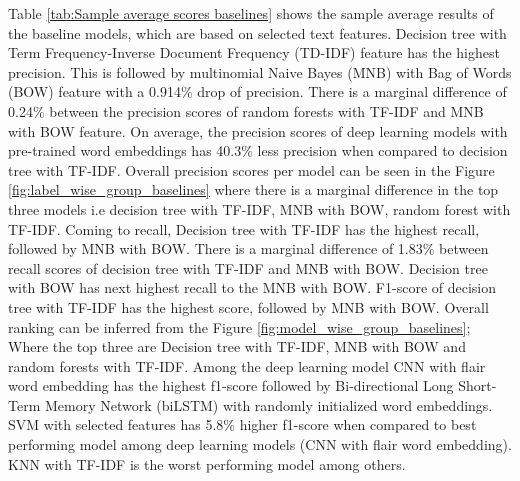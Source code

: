 Table \ref{tab:Sample average scores baselines} shows the sample average results of the baseline models, which are based on selected text features. Decision tree with Term Frequency-Inverse Document Frequency (TD-IDF) feature has the highest precision. This is followed by multinomial Naive Bayes (MNB) with Bag of Words (BOW) feature with a 0.914\% drop of precision. There is a marginal difference of 0.24\% between the precision scores of random forests with TF-IDF and MNB with BOW feature. On average, the precision scores of deep learning models with pre-trained word embeddings has 40.3\% less precision when compared to decision tree with TF-IDF. Overall precision scores per model can be seen in the Figure \ref{fig:label_wise_group_baselines} where there is a marginal difference in the top three models i.e decision tree with TF-IDF, MNB with  BOW, random forest with TF-IDF. Coming to recall, Decision tree with TF-IDF has the highest recall, followed by MNB with BOW. There is a marginal difference of 1.83\% between recall scores of decision tree with TF-IDF and MNB with BOW. Decision tree with BOW has next highest recall to the MNB with BOW. F1-score of decision tree with TF-IDF has the highest score, followed by MNB with BOW. Overall ranking can be inferred from the Figure \ref{fig:model_wise_group_baselines}; Where the top three are Decision tree with TF-IDF, MNB with BOW and random forests with TF-IDF. Among the deep learning model CNN with flair word embedding has the highest f1-score followed by Bi-directional Long Short-Term Memory Network (biLSTM) with randomly initialized word embeddings. SVM with selected features has 5.8\% higher f1-score when compared to best performing model among deep learning models (CNN with flair word embedding). KNN with TF-IDF is the worst performing model among others.
\pagebreak

